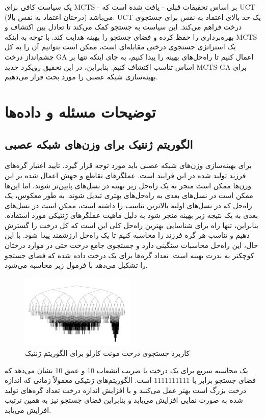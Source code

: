 \documentclass[11pt]{article}
\begin{document}
\begin{multicols}{2}
		یک سیاست کافی برای MCTS - بر اساس تحقیقات قبلی - یافت شده است که UCT (درختان اعتماد به نفس بالا) می‌باشد. UCT یک حد بالای اعتماد به نفس برای جستجوی درخت فراهم می‌کند. این سیاست به جستجو کمک می‌کند تا تعادل بین اکتشاف و بهره‌برداری را حفظ کرده و فضای جستجو را بهینه هدایت کند. با توجه به اینکه MCTS یک استراتژی جستجوی درختی مقابله‌ای است، ممکن است بتوانیم آن را به کل چشم‌انداز درخت GA اعمال کنیم تا راه‌حل‌های بهینه را پیدا کنیم، به جای اینکه تنها بر اساس تناسب اکتشاف کنیم. بنابراین، در این تحقیق رویکرد جدید MCTS-GA برای بهینه‌سازی شبکه عصبی را مورد بحث قرار می‌دهیم.
		\section{توضیحات مسئله و داده‌ها}
		\subsection{الگوریتم ژنتیک‏ برای وزن‌های شبکه عصبی}
		برای بهینه‌سازی وزن‌های شبکه عصبی باید مورد توجه قرار گیرد، تایید اعتبار گره‌های فرزند تولید شده در این فرایند است. عملگرهای تقاطع و جهش اعمال شده بر این وزن‌ها ممکن است منجر به یک راه‌حل زیر بهینه در نسل‌های پایین‌تر شوند، اما این‌ها ممکن است در نسل‌های بعدی به راه‌حل‌های بهتری تبدیل شوند. به طور معکوس، یک راه‌حل که در نسل‌های اولیه بالاترین تناسب را داشته است، ممکن است در نسل‌های بعدی به یک نتیجه زیر بهینه منجر شود به دلیل ماهیت عملگرهای ژنتیکی مورد استفاده. بنابراین، تنها راه برای شناسایی بهترین راه‌حل کلی این است که کل درخت را گسترش دهیم و تناسب هر گره فرزند را محاسبه کنیم تا یک راه‌حل ارزشمند پیدا شود. با این حال، این راه‌حل محاسبات سنگینی دارد و جستجوی جامع درخت حتی در موارد درختان کوچکتر به ندرت بهینه است. تعداد گره‌ها برای یک درخت داده شده که فضای جستجو را تشکیل می‌دهد با فرمول زیر محاسبه می‌شود.
		
		\begin{figure}[H]
			\centering
			\includegraphics[width=0.49\textwidth,keepaspectratio]{3.png}
			\caption{کاربرد جستجوی درخت مونت کارلو برای الگوریتم ژنتیک}
			\label{fig:fig3}
		\end{figure}
		یک محاسبه سریع برای یک درخت با ضریب انشعاب 10 و عمق 10 نشان می‌دهد که فضای جستجو برابر با 1111111111 است. الگوریتم‌های ژنتیکی معمولاً زمانی که اندازه درخت بزرگ است بهتر عمل می‌کنند و با افزایش اندازه درخت تعداد گره‌های تولید شده به صورت نمایی افزایش می‌یابد و بنابراین فضای جستجو نیز به همین ترتیب افزایش می‌یابد.
		

\end{multicols}
\end{document}

